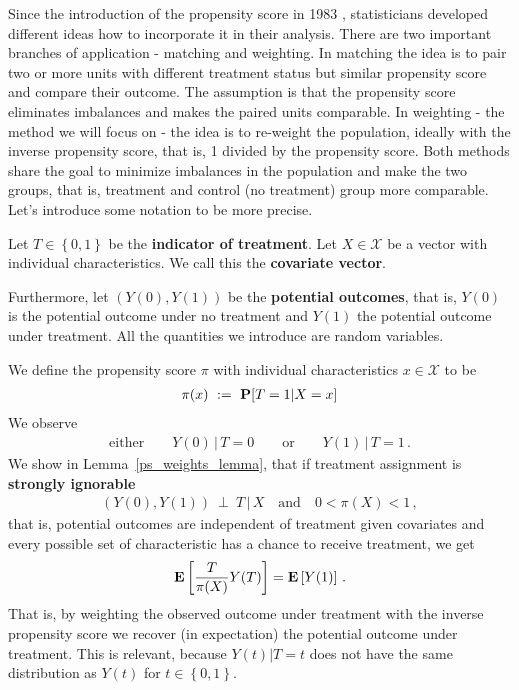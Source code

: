 Since the introduction of the propensity score in 1983 \cite{Rosenbaum1983}, statisticians developed different ideas how to incorporate it in their analysis. 
%
There are two important branches of application - matching and weighting.
In matching the idea is to pair two or more units with different treatment status but similar propensity score and compare their outcome. 
The assumption is that the propensity score eliminates imbalances and makes the paired units comparable.
In weighting - the method we will focus on - the idea is to re-weight the population, ideally with the inverse propensity score, that is, 1 divided by the propensity score.
Both methods share the goal to minimize imbalances in the population
and make the two groups, that is, treatment and control (no treatment) group more comparable.
Let's introduce some notation to be more precise.

Let $T\in \left\{ 0,1 \right\}$ be the \textbf{indicator of treatment}. 
Let $X\in\mathcal{X}$ be a vector with individual characteristics. We call this the \textbf{covariate vector}. 

Furthermore, let $(Y(0),Y(1))$ be the \textbf{potential outcomes}, that is, $Y(0)$ is the potential outcome under no treatment and $Y(1)$ the potential outcome under treatment.
All the quantities we introduce are random variables.

We define the propensity score $\pi$ with individual characteristics $x\in\mathcal{X}$ to be
\begin{gather*}
\pi(x)
\ 
:=
\ 
\P[T=1|X=x]
\end{gather*}
We observe  
\begin{gather*}
  \text{either}
  \qquad
  Y(0)\,|\,T=0
  \qquad
  \text{or}\qquad
  Y(1)\,|\,T=1
  \,.
\end{gather*}
We show in Lemma~\ref{ps_weights_lemma}, that if treatment assignment is \textbf{strongly ignorable}\cite[(1.3)]{Rosenbaum1983}
\begin{gather}
  \label{asu:treatment_asign_str_ing}
  (Y(0),Y(1))\ \perp \ T \,|\,X
  \quad
  \text{and}
  \quad
  0<\pi(X)<1
  \,,
\end{gather}
that is, 
potential outcomes are independent of treatment given covariates and every possible set of characteristic has a chance to receive treatment,
we get 
\begin{gather}
  \label{ipw}
  \mathbf{E}
  \left[ 
    \frac{T}{\pi(X)}Y(T)
  \right]
  =
  \mathbf{E}
  \left[ Y(1) \right]
  \,.
\end{gather}
That is, by weighting the observed outcome under treatment with the inverse propensity score we recover (in expectation) the potential outcome under treatment. 
This is relevant, because 
$Y(t)|T=t$ does not have the same distribution as $Y(t)$ for $t\in \left\{ 0,1 \right\}$.

